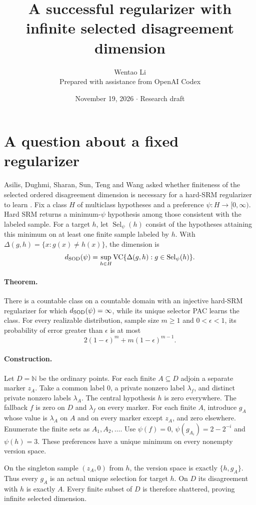 \documentclass[11pt]{article}
\title{A successful regularizer with infinite selected disagreement dimension}
\author{Wentao Li\\{\small Prepared with assistance from OpenAI Codex}}
\date{November 19, 2026 \quad $\cdot$ \quad Research draft}
\begin{document}
\maketitle
\section*{A question about a fixed regularizer}
Asilis, Dughmi, Sharan, Sun, Teng and Wang asked whether finiteness of the selected ordered disagreement dimension is necessary for a hard-SRM regularizer to learn \cite{ad}. Fix a class $H$ of multiclass hypotheses and a preference $\psi:H\to[0,\infty)$. Hard SRM returns a minimum-$\psi$ hypothesis among those consistent with the labeled sample. For a target $h$, let $\operatorname{Sel}_\psi(h)$ consist of the hypotheses attaining this minimum on at least one finite sample labeled by $h$. With $\Delta(g,h)=\{x:g(x)\ne h(x)\}$, the dimension is
\[
 d_{\rm SOD}(\psi)=\sup_{h\in H}\operatorname{VC}
                \{\Delta(g,h):g\in\operatorname{Sel}_\psi(h)\}.
\]

\paragraph{Theorem.} There is a countable class on a countable domain with an injective hard-SRM regularizer for which $d_{\rm SOD}(\psi)=\infty$, while its unique selector PAC learns the class. For every realizable distribution, sample size $m\ge1$ and $0<\epsilon<1$, its probability of error greater than $\epsilon$ is at most
\[
 2(1-\epsilon)^m+m(1-\epsilon)^{m-1}.
\]

\paragraph{Construction.} Let $D=\mathbb N$ be the ordinary points. For each finite $A\subseteq D$ adjoin a separate marker $z_A$. Take a common label $0$, a private nonzero label $\lambda_f$, and distinct private nonzero labels $\lambda_A$. The central hypothesis $h$ is zero everywhere. The fallback $f$ is zero on $D$ and $\lambda_f$ on every marker. For each finite $A$, introduce $g_A$ whose value is $\lambda_A$ on $A$ and on every marker except $z_A$, and zero elsewhere. Enumerate the finite sets as $A_1,A_2,\ldots$. Use $\psi(f)=0$, $\psi(g_{A_i})=2-2^{-i}$ and $\psi(h)=3$. These preferences have a unique minimum on every nonempty version space.

On the singleton sample $(z_A,0)$ from $h$, the version space is exactly $\{h,g_A\}$. Thus every $g_A$ is an actual unique selection for target $h$. On $D$ its disagreement with $h$ is exactly $A$. Every finite subset of $D$ is therefore shattered, proving infinite selected dimension.
\end{document}
